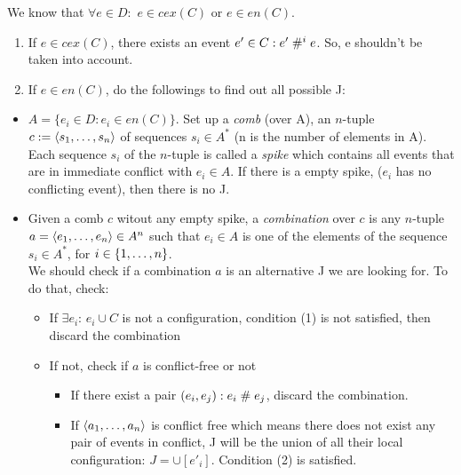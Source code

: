 \documentclass{llncs}
\begin{document}
\noindent
We know that $\forall e \in D: $ $e \in cex(C)$ or $e \in en(C)$.
\begin{enumerate}
\item
	If  $e \in cex(C)$, there exists an event $e' \in C: e' \mathrel{\#^i_{}} e$. So, e shouldn't be taken into account.
\item
	If $e \in en(C)$, do the followings to find out all possible J:
\end{enumerate}

\begin{itemize}
\item 
	$A = \{e_i \in D: e_i \in en(C)\}$.
	Set up a \emph{comb} (over A),
	an $n$-tuple $c \mathrel{:=} \langle s_1, \ldots, s_n\rangle$ of sequences $s_i \in A^*$
	(n is the number of elements in A).
	Each sequence $s_i$ of the $n$-tuple is called a \emph{spike} 
	which contains all events that are in immediate conflict with $e_{i} \in A$.
	If there is a empty spike, ($e_i$ has no conflicting event), then there is no J.
\item
	Given a comb $c$ witout any empty spike, a \emph{combination} over $c$ is any $n$-tuple $a = \langle e_1, \ldots, e_n\rangle \in A^n$ such that $e_i \in A$ is one of the elements of the sequence $s_i \in A^*$, for $i \in {\{ 1, \ldots, n \mathclose \}}$. \\
	We should check if a combination $a$ is an alternative J we are looking for. To do that, check:
	
\begin{itemize}
	\item
		If $\exists e_i$: $e_i \cup C$ is not a configuration, condition (1) is not satisfied, 
		then discard the combination
	\item
		If not, check if $a$ is conflict-free or not
		\begin{itemize}
			\item
				If there exist a pair $(e_i, e_j): e_i \mathrel{\#} e_j$, discard the combination.
			\item
				If $\langle a_1, \ldots, a_n\rangle$ is conflict free which means there does not exist any pair 
				of events in conflict, J will be the union of all their local configuration:
				$ J = \cup [e'_i]$. Condition (2) is satisfied.
		\end{itemize}
\end{itemize}
\end{itemize}
\end{document}

